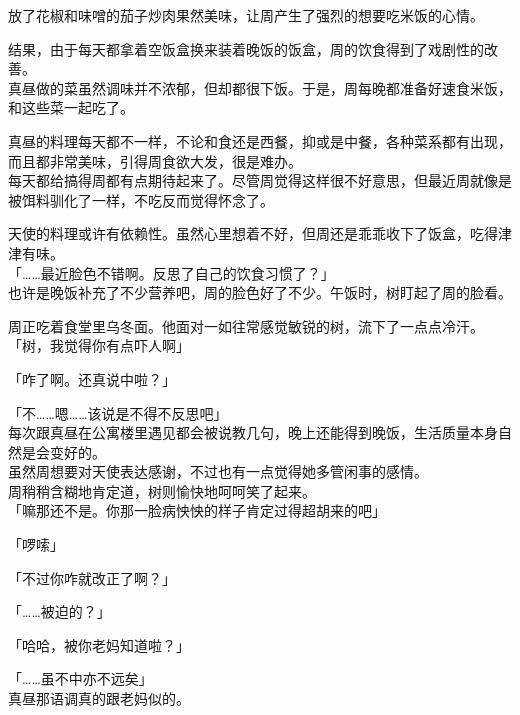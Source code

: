 放了花椒和味噌的茄子炒肉果然美味，让周产生了强烈的想要吃米饭的心情。\\

\vspace{2\baselineskip}

结果，由于每天都拿着空饭盒换来装着晚饭的饭盒，周的饮食得到了戏剧性的改善。\\

真昼做的菜虽然调味并不浓郁，但却都很下饭。于是，周每晚都准备好速食米饭，和这些菜一起吃了。

真昼的料理每天都不一样，不论和食还是西餐，抑或是中餐，各种菜系都有出现，而且都非常美味，引得周食欲大发，很是难办。\\

每天都给搞得周都有点期待起来了。尽管周觉得这样很不好意思，但最近周就像是被饵料驯化了一样，不吃反而觉得怀念了。

天使的料理或许有依赖性。虽然心里想着不好，但周还是乖乖收下了饭盒，吃得津津有味。\\

「……最近脸色不错啊。反思了自己的饮食习惯了？」\\

也许是晚饭补充了不少营养吧，周的脸色好了不少。午饭时，树盯起了周的脸看。

周正吃着食堂里乌冬面。他面对一如往常感觉敏锐的树，流下了一点点冷汗。\\

「树，我觉得你有点吓人啊」

「咋了啊。还真说中啦？」

「不……嗯……该说是不得不反思吧」\\

每次跟真昼在公寓楼里遇见都会被说教几句，晚上还能得到晚饭，生活质量本身自然是会变好的。\\

虽然周想要对天使表达感谢，不过也有一点觉得她多管闲事的感情。\\

周稍稍含糊地肯定道，树则愉快地呵呵笑了起来。\\

「嘛那还不是。你那一脸病怏怏的样子肯定过得超胡来的吧」

「啰嗦」

「不过你咋就改正了啊？」

「……被迫的？」

「哈哈，被你老妈知道啦？」

「……虽不中亦不远矣」\\

真昼那语调真的跟老妈似的。

